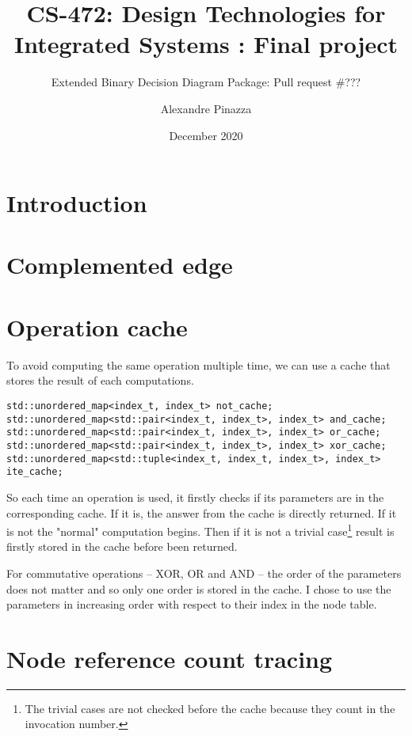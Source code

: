 \documentclass[nonacm=true]{acmart}
\title{CS-472: Design Technologies for Integrated Systems : Final project}
\subtitle{Extended Binary Decision Diagram Package: Pull request \#???}
\author{Alexandre Pinazza}
\affiliation{
    \institution{IC, EPFL}
    \state{Vaud}
    \city{Lausanne}
    \country{Switzerland}
}
\date{December 2020}
\begin{document}
\maketitle
{}

\section{Introduction}

\section{Complemented edge}

\section{Operation cache}
To avoid computing the same operation multiple time, we can use a cache that stores the result of each computations.

\begin{verbatim}
std::unordered_map<index_t, index_t> not_cache;
std::unordered_map<std::pair<index_t, index_t>, index_t> and_cache;
std::unordered_map<std::pair<index_t, index_t>, index_t> or_cache;
std::unordered_map<std::pair<index_t, index_t>, index_t> xor_cache;
std::unordered_map<std::tuple<index_t, index_t, index_t>, index_t> ite_cache;
\end{verbatim}

So each time an operation is used, it firstly checks if its parameters are in the corresponding cache. If it is, the answer from the cache is directly returned. If it is not the "normal" computation begins. Then if it is not a trivial case\footnote{The trivial cases are not checked before the cache because they count in the invocation number.} result is firstly stored in the cache before been returned.

For commutative operations -- XOR, OR and AND -- the order of the parameters does not matter and so only one order is stored in the cache. I chose to use the parameters in increasing order with respect to their index in the node table. 

\section{Node reference count tracing}

\listoftodos{}
\end{document}
